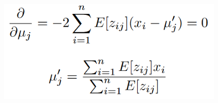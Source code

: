             \begin{figure} [ht]
                \centering
                \includegraphics[scale=0.4]{images/m-step_GMM_zeroing.png}
            \end{figure}

